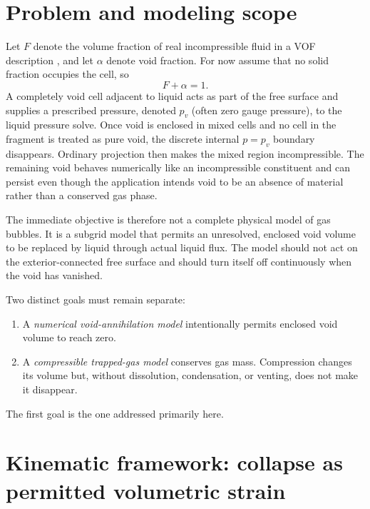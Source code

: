 \documentclass[11pt]{article}
\begin{document}
\clearpage
\tableofcontents
\clearpage

\section{Problem and modeling scope}

Let \(F\) denote the volume fraction of real incompressible fluid in a VOF
description \cite{hirt-nichols1981}, and let
\(\alpha\) denote void fraction.  For now assume that no solid fraction occupies the
cell, so
\begin{equation}
  F+\alpha=1.
\end{equation}
A completely void cell adjacent to liquid acts as part of the free surface and supplies
a prescribed pressure, denoted \(p_v\) (often zero gauge pressure), to the liquid pressure
solve.  Once void is enclosed in mixed cells and no cell in the fragment is treated as
pure void, the discrete internal \(p=p_v\) boundary disappears.  Ordinary projection
then makes the mixed region incompressible.  The remaining void behaves numerically like
an incompressible constituent and can persist even though the application intends void
to be an absence of material rather than a conserved gas phase.

The immediate objective is therefore not a complete physical model of gas bubbles.  It
is a subgrid model that permits an unresolved, enclosed void volume to be replaced by
liquid through actual liquid flux.  The model should not act on the exterior-connected
free surface and should turn itself off continuously when the void has vanished.

Two distinct goals must remain separate:
\begin{enumerate}
  \item A \emph{numerical void-annihilation model} intentionally permits enclosed void
        volume to reach zero.
  \item A \emph{compressible trapped-gas model} conserves gas mass.  Compression changes
        its volume but, without dissolution, condensation, or venting, does not make it
        disappear.
\end{enumerate}
The first goal is the one addressed primarily here.

\section{Kinematic framework: collapse as permitted volumetric strain}
\end{document}
